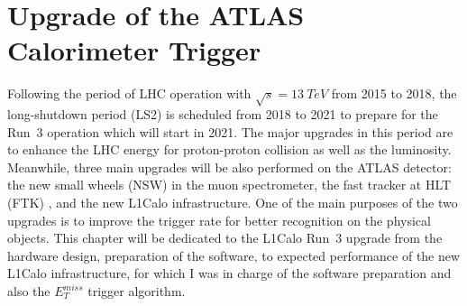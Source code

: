 \chapter{Upgrade of the ATLAS Calorimeter Trigger}
Following the period of LHC operation with $\sqrt{s}=13~TeV$ from 2015 to 2018, the long-shutdown period (LS2) is scheduled from 2018 to 2021 to prepare for the Run~3 operation which will start in 2021. The major upgrades in this period are to enhance the LHC energy for proton-proton collision as well as the luminosity. Meanwhile, three main upgrades will be also performed on the ATLAS detector: the new small wheels (NSW) in the muon spectrometer\cite{STELZER20161160}, the fast tracker at HLT (FTK) \cite{Shochet:1552953}, and the new L1Calo infrastructure. One of the main purposes of the two upgrades is to improve the trigger rate for better recognition on the physical objects. This chapter will be dedicated to the L1Calo Run~3 upgrade from the hardware design, preparation of the software, to expected performance of the new L1Calo infrastructure, for which I was in charge of the software preparation and also the $E^{miss}_{T}$ trigger algorithm. 
